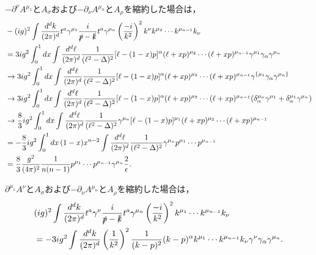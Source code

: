 $-\partial^\nu A^{\mu_1}$と$A_\sigma$および$-\partial_\nu A^{\mu_n}$と$A_\rho$を縮約した場合は，
\begin{align*}
  & -(ig)^2 \int \frac{d^dk}{(2\pi)^d} t^a \gamma^{\mu_1} \frac{i}{\slashed{p} - \slashed{k}} t^a \gamma^{\mu_n}
  \left( \frac{-i}{k^2} \right)^2 k^\nu k^{\mu_2} \cdots k^{\mu_{n-1}} k_\nu \\
  &= 3 ig^2 \int_0^1 dx \int\frac{d^d\ell}{(2\pi)^d} \frac{1}{(\ell^2-\Delta)^2}
  [\ell-(1-x)p]^\alpha (\ell+xp)^{\mu_2} \cdots (\ell+xp)^{\mu_{n-1}} \gamma^{\mu_1} \gamma_\alpha \gamma^{\mu_n} \\
  &\to 3 ig^2 \int_0^1 dx \int\frac{d^d\ell}{(2\pi)^d} \frac{1}{(\ell^2-\Delta)^2}
  [\ell-(1-x)p]^\alpha (\ell+xp)^{\mu_2} \cdots (\ell+xp)^{\mu_{n-1}} \gamma^{\{\mu_1} \gamma_\alpha \gamma^{\mu_n\}} \\
  &\to 3 ig^2 \int_0^1 dx \int\frac{d^d\ell}{(2\pi)^d} \frac{1}{(\ell^2-\Delta)^2}
  [\ell-(1-x)p]^\alpha (\ell+xp)^{\mu_2} \cdots (\ell+xp)^{\mu_{n-1}}
  (\delta^{\mu_n}_\alpha \gamma^{\mu_1} + \delta^{\mu_1}_\alpha \gamma^{\mu_n}) \\
  &\to \frac{8}{3} ig^2 \int_0^1 dx \int\frac{d^d\ell}{(2\pi)^d} \frac{1}{(\ell^2-\Delta)^2}
  \gamma^{\mu_n} [\ell-(1-x)p]^{\mu_1} (\ell+xp)^{\mu_2} \cdots (\ell+xp)^{\mu_{n-1}} \\
  &= -\frac{8}{3} ig^2 \int_0^1 dx \, (1-x)x^{n-2} \int\frac{d^d\ell}{(2\pi)^d} \frac{1}{(\ell^2-\Delta)^2}
  \gamma^{\mu_n} p^{\mu_1} \cdots p^{\mu_{n-1}} \\
  &= \frac{8}{3} \frac{g^2}{(4\pi)^2} \frac{1}{n(n-1)} p^{\mu_1} \cdots p^{\mu_{n-1}} \gamma^{\mu_n} \frac{2}{\epsilon} .
\end{align*}

$\partial^{\mu_1}A^\nu$と$A_\sigma$および$-\partial_\nu A^{\mu_n}$と$A_\rho$を縮約した場合は，
\begin{align*}
  & (ig)^2 \int \frac{d^dk}{(2\pi)^d} t^a \gamma^\nu \frac{i}{\slashed{p} - \slashed{k}} t^a \gamma^{\mu_n}
  \left( \frac{-i}{k^2} \right)^2 k^{\mu_1} \cdots k^{\mu_{n-1}} k_\nu \\
  &= - 3 ig^2 \int\frac{d^dk}{(2\pi)^d} \left( \frac{1}{k^2} \right)^2 \frac{1}{(k-p)^2}
  (k-p)^\alpha k^{\mu_1} \cdots k^{\mu_{n-1}} k_\nu \gamma^\nu \gamma_\alpha \gamma^{\mu_n} .
\end{align*}

